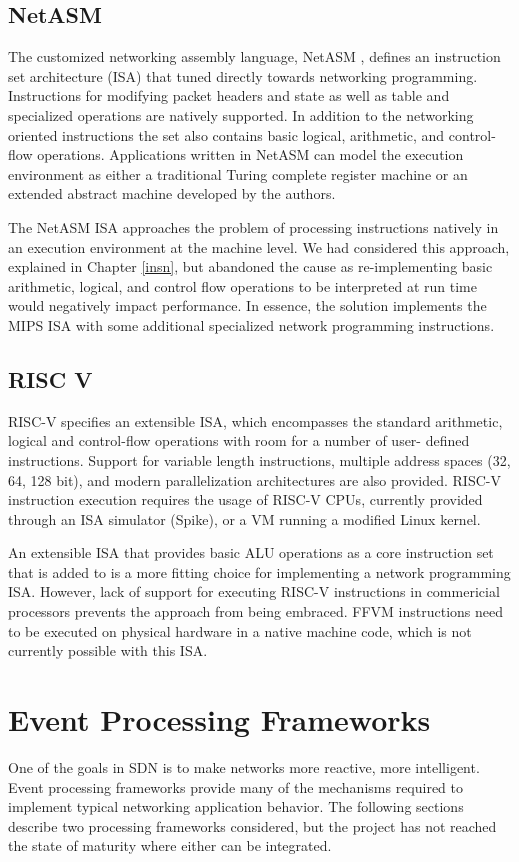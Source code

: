 \subsection{NetASM}
\label{related:netasm}
The customized networking assembly language, NetASM \cite{netasm}, defines an
instruction set architecture (ISA) that tuned directly towards networking
programming. Instructions for modifying packet headers and state as well
as table and specialized operations are natively supported. In addition to the
networking oriented instructions the set also contains basic logical,
arithmetic, and control-flow operations. Applications written in NetASM can
model the execution environment as either a traditional Turing complete
register machine or an extended abstract machine developed by the authors.

The NetASM ISA approaches the problem of processing instructions natively in an execution environment at the machine level. We had considered this approach, explained in Chapter \ref{insn}, but abandoned the cause as re-implementing basic arithmetic, logical, and control flow operations to be interpreted at run time would negatively impact performance. In essence, the solution implements the MIPS ISA with some additional specialized network programming instructions.

\subsection{RISC V}
\label{related:riscv}
RISC-V \cite{riscv} specifies an extensible ISA, which encompasses the standard
arithmetic, logical and control-flow operations with room for a number of user-
defined instructions. Support for variable length instructions, multiple
address spaces (32, 64, 128 bit), and modern parallelization architectures are
also provided. RISC-V instruction execution requires the usage of RISC-V CPUs,
currently provided through an ISA simulator (Spike), or a VM running a modified
Linux kernel.

An extensible ISA that provides basic ALU operations as a core instruction set that is added to is a more fitting choice for implementing a network programming ISA. However, lack of support for executing RISC-V instructions in commericial processors prevents the approach from being embraced. FFVM instructions need to be executed on physical hardware in a native machine code, which is not currently possible with this ISA.

\section{Event Processing Frameworks}
\label{related:event}
One of the goals in SDN is to make networks more reactive, more intelligent.
Event processing frameworks provide many of the mechanisms required to implement
typical networking application behavior. The following sections describe two
processing frameworks considered, but the project has not reached the state
of maturity where either can be integrated.

